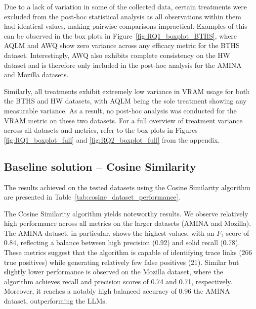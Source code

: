 \documentclass[conference]{IEEEtran}
\begin{document}
Due to a lack of variation in some of the collected data, certain treatments were excluded from the post-hoc statistical analysis as all observations within them had identical values, making pairwise comparisons impractical. Examples of this can be observed in the box plots in Figure~\ref{fig:RQ1_boxplot_BTHS}, where AQLM and AWQ show zero variance across any efficacy metric for the BTHS dataset. Interestingly, AWQ also exhibits complete consistency on the HW dataset and is therefore only included in the post-hoc analysis for the AMINA and Mozilla datasets. 

Similarly, all treatments exhibit extremely low variance in VRAM usage for both the BTHS and HW datasets, with AQLM being the sole treatment showing any measurable variance. As a result, no post-hoc analysis was conducted for the VRAM metric on these two datasets. For a full overview of treatment variance across all datasets and metrics, refer to the box plots in Figures \ref{fig:RQ1_boxplot_full} and \ref{fig:RQ2_boxplot_full} from the appendix.

\subsection{\textbf{Baseline solution} -- Cosine Similarity}

The results achieved on the tested datasets using the Cosine Similarity algorithm are presented in Table~\ref{tab:cosine_dataset_performance}.

\begin{table}[H]
    \centering
    \caption{Cosine metrics across datasets; threshold $0.34$}
    \label{tab:cosine_dataset_performance}
\end{table}

The Cosine Similarity algorithm yields noteworthy results. We observe relatively high performance across all metrics on the larger datasets (AMINA and Mozilla). The AMINA dataset, in particular, shows the highest values, with an $F_1$-score of 0.84, reflecting a balance between high precision (0.92) and solid recall (0.78). These metrics suggest that the algorithm is capable of identifying trace links (266 true positives) while generating relatively few false positives (21). Similar but slightly lower performance is observed on the Mozilla dataset, where the algorithm achieves recall and precision scores of 0.74 and 0.71, respectively. Moreover, it reaches a notably high balanced accuracy of 0.96 the AMINA dataset, outperforming the LLMs.
\end{document}
